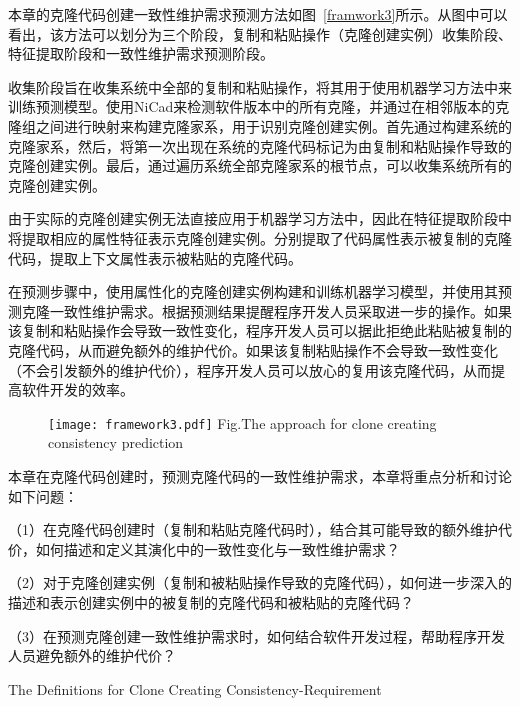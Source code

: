 本章的克隆代码创建一致性维护需求预测方法如图~\ref{framwork3}所示。从图中可以看出，该方法可以划分为三个阶段，复制和粘贴操作（克隆创建实例）收集阶段、特征提取阶段和一致性维护需求预测阶段。

收集阶段旨在收集系统中全部的复制和粘贴操作，将其用于使用机器学习方法中来训练预测模型。使用NiCad来检测软件版本中的所有克隆，并通过在相邻版本的克隆组之间进行映射来构建克隆家系，用于识别克隆创建实例。首先通过构建系统的克隆家系，然后，将第一次出现在系统的克隆代码标记为由复制和粘贴操作导致的克隆创建实例。最后，通过遍历系统全部克隆家系的根节点，可以收集系统所有的克隆创建实例。

由于实际的克隆创建实例无法直接应用于机器学习方法中，因此在特征提取阶段中将提取相应的属性特征表示克隆创建实例。分别提取了代码属性表示被复制的克隆代码，提取上下文属性表示被粘贴的克隆代码。

在预测步骤中，使用属性化的克隆创建实例构建和训练机器学习模型，并使用其预测克隆一致性维护需求。根据预测结果提醒程序开发人员采取进一步的操作。如果该复制和粘贴操作会导致一致性变化，程序开发人员可以据此拒绝此粘贴被复制的克隆代码，从而避免额外的维护代价。如果该复制粘贴操作不会导致一致性变化（不会引发额外的维护代价），程序开发人员可以放心的复用该克隆代码，从而提高软件开发的效率。

\begin{figure}[htbp]
\centering
\texttt{[image: framework3.pdf]}
{Fig.$\!$}{The approach for clone creating consistency prediction}
\vspace{-1em}
\end{figure}

本章在克隆代码创建时，预测克隆代码的一致性维护需求，本章将重点分析和讨论如下问题：

（1）在克隆代码创建时（复制和粘贴克隆代码时），结合其可能导致的额外维护代价，如何描述和定义其演化中的一致性变化与一致性维护需求？

（2）对于克隆创建实例（复制和被粘贴操作导致的克隆代码），如何进一步深入的描述和表示创建实例中的被复制的克隆代码和被粘贴的克隆代码？

（3）在预测克隆创建一致性维护需求时，如何结合软件开发过程，帮助程序开发人员避免额外的维护代价？



{The Definitions for Clone Creating Consistency-Requirement}

